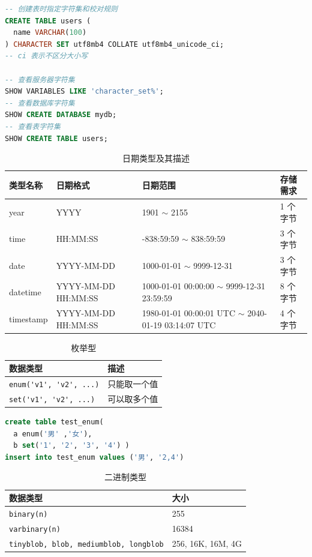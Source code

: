 \begin{lstlisting}[language=SQL]
-- 创建表时指定字符集和校对规则
CREATE TABLE users (
  name VARCHAR(100)
) CHARACTER SET utf8mb4 COLLATE utf8mb4_unicode_ci;
-- ci 表示不区分大小写

-- 查看服务器字符集
SHOW VARIABLES LIKE 'character_set%';
-- 查看数据库字符集
SHOW CREATE DATABASE mydb;
-- 查看表字符集
SHOW CREATE TABLE users;
\end{lstlisting}

\begin{table}[H]
    \centering
    \begin{tabular}{|l|l|p{5cm}|l|}
        \hline
        \textbf{类型名称} & \textbf{日期格式} & \textbf{日期范围} & \textbf{存储需求} \\ \hline
        year & YYYY & 1901 $\sim$ 2155 & 1 个字节 \\ \hline
        time & HH:MM:SS & -838:59:59 $\sim$ 838:59:59 & 3 个字节 \\ \hline
        date & YYYY-MM-DD & 1000-01-01 $\sim$ 9999-12-31 & 3 个字节 \\ \hline
        datetime & YYYY-MM-DD HH:MM:SS & 1000-01-01 00:00:00 $\sim$ 9999-12-31 23:59:59 & 8 个字节 \\ \hline
        timestamp & YYYY-MM-DD HH:MM:SS & 1980-01-01 00:00:01 UTC $\sim$ 2040-01-19 03:14:07 UTC & 4 个字节 \\ \hline
    \end{tabular}
    \caption{日期类型及其描述}
    \label{tab:date_types}
\end{table}

\begin{table}[H]
  \centering
  \begin{tabular}{|l|l|}
    \hline
    \textbf{数据类型} & \textbf{描述} \\ \hline
    \verb|enum('v1', 'v2', ...)| & 只能取一个值 \\ \hline
    \verb|set('v1', 'v2', ...)| & 可以取多个值 \\ \hline
  \end{tabular}
  \caption{枚举型}
\end{table}

\begin{lstlisting}[language=SQL]
create table test_enum(
  a enum('男' ,'女'),
  b set('1', '2', '3', '4') )
insert into test_enum values ('男', '2,4')
\end{lstlisting}

\begin{table}[H]
  \centering
  \begin{tabular}{|l|l|}
    \hline
    \textbf{数据类型} & \textbf{大小} \\ \hline
    \verb|binary(n)| & 255 \\ \hline
    \verb|varbinary(n)| & 16384 \\ \hline
    \verb|tinyblob, blob, mediumblob, longblob| & 256, 16K, 16M, 4G \\ \hline
  \end{tabular}
  \caption{二进制类型}
\end{table}

